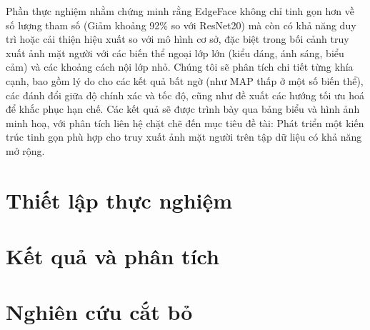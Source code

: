 Phần thực nghiệm nhằm chứng minh rằng EdgeFace không chỉ tinh gọn hơn về số lượng tham số (Giảm khoảng 92\% so với ResNet20) mà còn có khả năng duy trì hoặc cải thiện hiệu xuất so với mô hình cơ sở, đặc biệt trong bối cảnh truy xuất ảnh mặt người với các biến thể ngoại lớp lớn (kiểu dáng, ánh sáng, biểu cảm) và các khoảng cách nội lớp nhỏ. Chúng tôi sẽ phân tích chi tiết từng khía cạnh, bao gồm lý do cho các kết quả bất ngờ (như MAP thấp ở một số biến thể), các đánh đổi giữa độ chính xác và tốc độ, cũng như đề xuất các hướng tối ưu hoá để khắc phục hạn chế. Các kết quả sẽ được trình bày qua bảng biểu và hình ảnh minh hoạ, với phân tích liên hệ chặt chẽ đến mục tiêu đề tài: Phát triển một kiến trúc tinh gọn phù hợp cho truy xuất ảnh mặt người trên tập dữ liệu có khả năng mở rộng.

\section {Thiết lập thực nghiệm}

\section {Kết quả và phân tích}

\section {Nghiên cứu cắt bỏ}